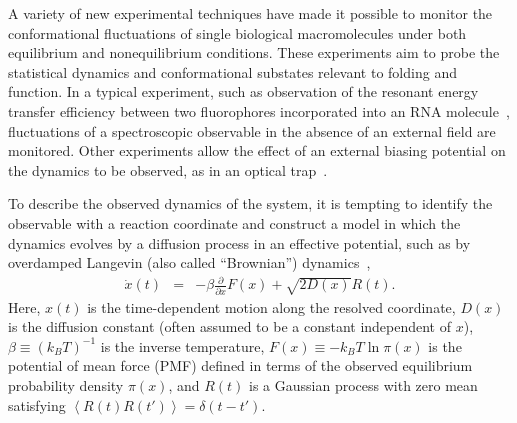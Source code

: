 \documentclass[aps,prl,twocolumn,superscriptaddress,floatfix]{revtex4-1}
\newcommand{\expect}[1]{\left \langle #1 \right \rangle}                %
\begin{document}
A variety of new experimental techniques have made it possible to monitor the conformational fluctuations of single biological macromolecules under both equilibrium and nonequilibrium conditions.
These experiments aim to probe the statistical dynamics and conformational substates relevant to folding and function.
In a typical experiment, such as observation of the resonant energy transfer efficiency between two fluorophores incorporated into an RNA molecule~\cite{scherer:jmb:2008:equilibrium}, fluctuations of a spectroscopic observable in the absence of an external field are monitored.
Other experiments allow the effect of an external biasing potential on the dynamics to be observed, as in an optical trap~\cite{woodside:prl:2005:optical-force-clamp,collin:biophys-j:2006:tar-rna-hopping,woodside:science:2006:dna-hairpin-optical-trap}.



To describe the observed dynamics of the system, it is tempting to identify the observable with a reaction coordinate and construct a model in which the dynamics evolves by a diffusion process in an effective potential, such as by overdamped Langevin (also called ``Brownian'') dynamics~\cite{gardiner:handbook-of-stochastic-methods},
\color{black}
\begin{eqnarray}
\dot{x}(t) &=& - \beta \frac{\partial}{\partial x}F(x) + \sqrt{2 D(x)} R(t) \label{equation:brownian-equation-of-motion} .
\end{eqnarray}
Here, $x(t)$ is the time-dependent motion along the resolved coordinate, $D(x)$ is the diffusion constant (often assumed to be a constant independent of $x$), 
\color{black}
$\beta \equiv (k_B T)^{-1}$ is the inverse temperature, $F(x) \equiv - k_B T\ln \pi(x)$ is the potential of mean force (PMF) defined in terms of the observed equilibrium probability density $\pi(x)$, and $R(t)$ is a Gaussian process with zero mean satisfying $\expect{R(t) R(t')} = \delta(t - t')$.
\end{document}

